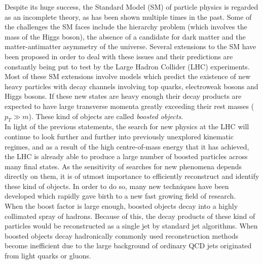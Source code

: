 \documentclass[main]{subfiles} %
\begin{document}


\doublespacing

\vspace{20pt}

Despite its huge success, the Standard Model (SM) of particle physics is regarded as an incomplete theory, as has been shown multiple times in the past. Some of the challenges the SM faces include the hierarchy problem (which involves the mass of the Higgs boson), the absence of a candidate for dark matter and the matter-antimatter asymmetry of the universe. Several extensions to the SM have been proposed in order to deal with these issues and their predictions are constantly being put to test by the Large Hadron Collider (LHC) experiments. Most of these SM extensions involve models which predict the existence of new heavy particles with decay channels involving top quarks, electroweak bosons and Higgs bosons. If these new states are heavy enough their decay products are expected to have large transverse momenta greatly exceeding their rest masses ($p_T \gg m$). These kind of objects are called \textit{boosted objects}. \\ 

In light of the previous statements, the search for new physics at the LHC will continue to look further and further into previously unexplored kinematic regimes, and as a result of the high centre-of-mass energy that it has achieved, the LHC is already able to produce a large number of boosted particles across many final states. As the sensitivity of searches for new phenomena depends directly on them, it is of utmost importance to efficiently reconstruct and identify these kind of objects. In order to do so, many new techniques have been developed which rapidly gave birth to a new fast growing field of research. \\

When the boost factor is large enough, boosted objects decay into a highly collimated spray of hadrons. Because of this, the decay products of these kind of particles would be reconstructed as a single jet by standard jet algorithms. When boosted objects decay hadronically commonly used reconstruction methods become inefficient due to the large background of ordinary QCD jets originated from light quarks or gluons. \\ 
\end{document}
